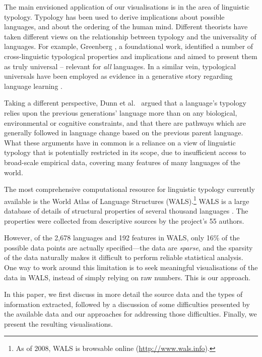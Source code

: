 \documentclass[11pt]{article}
\begin{document}
The main envisioned application of our visualisations is in the area of linguistic typology. Typology has been used to derive implications about possible languages, and about the ordering of the human mind. Different theorists have taken different views on the relationship between typology and the universality of languages. For example, Greenberg , a foundational work, identified a number of cross-linguistic typological properties and implications and aimed to present them as truly universal -- relevant for \textit{all} languages. In a similar vein, typological universals have been employed as evidence in a generative story regarding language learning \cite{chomsky}.

Taking a different perspective, Dunn et al.\  argued that a language's typology relies upon the previous generations' language more than on any biological, environmental or cognitive constraints, and that there are pathways which are generally followed in language change based on the previous parent language. What these arguments have in common is a reliance on a view of linguistic typology that is potentially restricted in its scope, due to insufficient access to broad-scale empirical data, covering many features of many languages of the world. 

The most comprehensive computational resource for linguistic typology currently available is the World Atlas of Language Structures (WALS).\footnote{As of 2008, WALS is browsable online (\url{http://www.wals.info}).}  WALS is a large database of details of structural properties of several thousand languages \cite{wals-2011}. The properties were collected from descriptive sources by the project's 55 authors.

However, of the 2,678 languages and 192 features in WALS, only 16\% of the possible data points are actually specified---the data are \emph{sparse}, and the sparsity of the data naturally makes it difficult to perform reliable statistical analysis. One way to work around this limitation is to seek meaningful visualisations of the data in WALS, instead of simply relying on raw numbers. This is our approach. 

In this paper, we first discuss in more detail the source data and the types of information extracted, followed by a discussion of some difficulties presented by the available data and our approaches for addressing those difficulties. Finally, we present the resulting visualisations.
\end{document}
